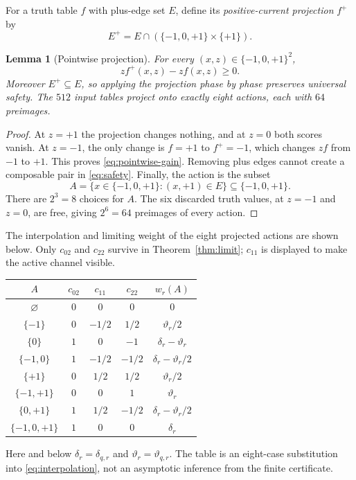 \documentclass[11pt]{article}
\newtheorem{lemma}[theorem]{Lemma}
\theoremstyle{definition}
\theoremstyle{remark}
\newcommand{\T}{\{-1,0,+1\}}
\newcommand{\dd}{\delta}
\newcommand{\thh}{\vartheta}
\begin{document}
For a truth table $f$ with plus-edge set $E$, define its
\emph{positive-current projection} $f^+$ by
\begin{equation}
 E^+=E\cap(\T\times\{+1\}).
 \label{eq:projection}
\end{equation}

\begin{lemma}[Pointwise projection]
\label{lem:projection}
For every $(x,z)\in\T^2$,
\begin{equation}
 zf^+(x,z)-zf(x,z)\ge0.
 \label{eq:pointwise-gain}
\end{equation}
Moreover $E^+\subseteq E$, so applying the projection phase by phase
preserves universal safety.  The $512$ input tables project onto exactly
eight actions, each with $64$ preimages.
\end{lemma}

\begin{proof}
At $z=+1$ the projection changes nothing, and at $z=0$ both scores vanish.
At $z=-1$, the only change is $f=+1$ to $f^+=-1$, which changes $zf$ from
$-1$ to $+1$.  This proves \eqref{eq:pointwise-gain}.  Removing plus edges
cannot create a composable pair in \eqref{eq:safety}.  Finally, the action
is the subset
\[
 A=\{x\in\T:(x,+1)\in E\}\subseteq\T.
\]
There are $2^3=8$ choices for $A$.  The six discarded truth values, at
$z=-1$ and $z=0$, are free, giving $2^6=64$ preimages of every action.
\end{proof}

The interpolation and limiting weight of the eight projected actions are
shown below.  Only $c_{02}$ and $c_{22}$ survive in
Theorem~\ref{thm:limit}; $c_{11}$ is displayed to make the active channel
visible.
\begin{center}
\small
\begin{tabular}{@{}c@{\qquad}c@{\qquad}c@{\qquad}c@{\qquad}c@{}}
\toprule
$A$&$c_{02}$&$c_{11}$&$c_{22}$&$w_r(A)$\\
\midrule
$\varnothing$&$0$&$0$&$0$&$0$\\
$\{-1\}$&$0$&$-1/2$&$1/2$&$\thh_r/2$\\
$\{0\}$&$1$&$0$&$-1$&$\dd_r-\thh_r$\\
$\{-1,0\}$&$1$&$-1/2$&$-1/2$&$\dd_r-\thh_r/2$\\
$\{+1\}$&$0$&$1/2$&$1/2$&$\thh_r/2$\\
$\{-1,+1\}$&$0$&$0$&$1$&$\thh_r$\\
$\{0,+1\}$&$1$&$1/2$&$-1/2$&$\dd_r-\thh_r/2$\\
$\{-1,0,+1\}$&$1$&$0$&$0$&$\dd_r$\\
\bottomrule
\end{tabular}
\end{center}
Here and below $\dd_r=\dd_{q,r}$ and $\thh_r=\thh_{q,r}$.  The table is an
eight-case substitution into \eqref{eq:interpolation}, not an asymptotic
inference from the finite certificate.
\end{document}
